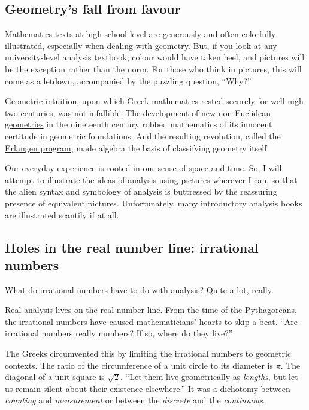 \documentclass[
  a4paper,
]{article}
\begin{document}
\subsection{Geometry's fall from
favour}\label{geometrys-fall-from-favour}

Mathematics texts at high school level are generously and often
colorfully illustrated, especially when dealing with geometry. But, if
you look at any university-level analysis textbook, colour would have
taken heel, and pictures will be the exception rather than the norm. For
those who think in pictures, this will come as a letdown, accompanied by
the puzzling question, ``Why?''

Geometric intuition, upon which Greek mathematics rested securely for
well nigh two centuries, was not infallible. The development of new
\href{https://en.wikipedia.org/wiki/Non-Euclidean_geometry}{non-Euclidean
geometries} in the nineteenth century robbed mathematics of its innocent
certitude in geometric foundations. And the resulting revolution, called
the \href{https://en.wikipedia.org/wiki/Erlangen_program}{Erlangen
program}, made algebra the basis of classifying geometry itself.

Our everyday experience is rooted in our sense of space and time. So, I
will attempt to illustrate the ideas of analysis using pictures wherever
I can, so that the alien syntax and symbology of analysis is buttressed
by the reassuring presence of equivalent pictures. Unfortunately, many
introductory analysis books are illustrated scantily if at all.

\subsection{Holes in the real number line: irrational
numbers}\label{holes-in-the-real-number-line-irrational-numbers}

What do irrational numbers have to do with analysis? Quite a lot,
really.

Real analysis lives on the real number line. From the time of the
Pythagoreans, the irrational numbers have caused mathematicians' hearts
to skip a beat. ``Are irrational numbers really numbers? If so, where do
they live?''

The Greeks circumvented this by limiting the irrational numbers to
geometric contexts. The ratio of the circumference of a unit circle to
its diameter is \(\pi\). The diagonal of a unit square is \(\sqrt{2}\).
``Let them live geometrically as \emph{lengths}, but let us remain
silent about their existence elsewhere.'' It was a dichotomy between
\emph{counting} and \emph{measurement} or between the \emph{discrete}
and the \emph{continuous}.
\end{document}
